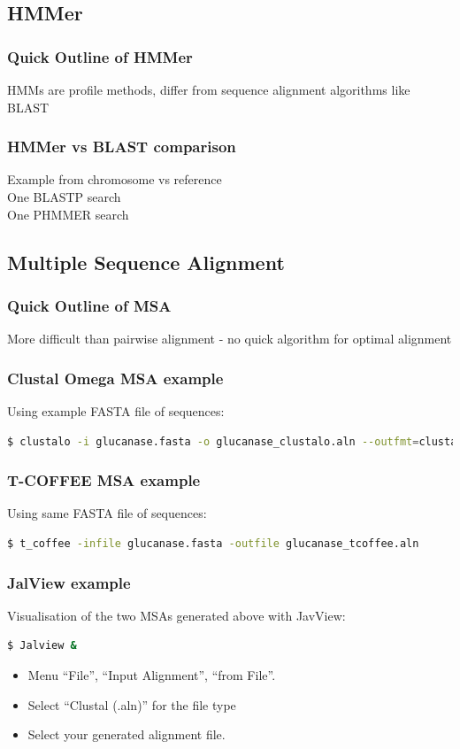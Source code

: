 \documentclass[table]{beamer}
\begin{document}
   \subsection{HMMer}
    \begin{frame}
      \frametitle{Quick Outline of HMMer}   
      HMMs are profile methods, differ from sequence alignment algorithms like BLAST
    \end{frame}

    \begin{frame}
      \frametitle{HMMer vs BLAST comparison}   
      Example from chromosome vs reference \\
      One BLASTP search \\
      One PHMMER search
    \end{frame}

   \subsection{Multiple Sequence Alignment}

\begin{frame}
\frametitle{Quick Outline of MSA}
More difficult than pairwise alignment - no quick algorithm for optimal alignment
\end{frame}

\begin{frame}[fragile]
\frametitle{Clustal Omega MSA example}
Using example FASTA file of sequences:
\begin{lstlisting}[language=bash]
$ clustalo -i glucanase.fasta -o glucanase_clustalo.aln --outfmt=clustal
\end{lstlisting}
\end{frame}

\begin{frame}[fragile]
\frametitle{T-COFFEE MSA example}
Using same FASTA file of sequences:
\begin{lstlisting}[language=bash]
$ t_coffee -infile glucanase.fasta -outfile glucanase_tcoffee.aln
\end{lstlisting}
\end{frame}

\begin{frame}[fragile]
\frametitle{JalView example}
Visualisation of the two MSAs generated above with JavView:
\begin{lstlisting}[language=bash]
$ Jalview &
\end{lstlisting}
\begin{itemize}
\item Menu ``File'', ``Input Alignment'', ``from File''.
\item Select ``Clustal (.aln)'' for the file type
\item Select your generated alignment file.
\end{itemize}
\end{frame}
\end{document}
